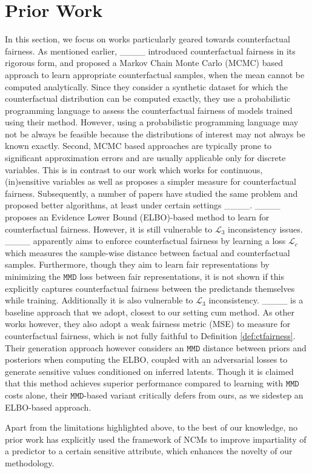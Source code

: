 \section{Prior Work}
\label{subsec:prior_work}
In this section, we focus on works particularly geared towards counterfactual fairness. As mentioned earlier, ____ introduced counterfactual fairness in its rigorous form, and proposed a Markov Chain Monte Carlo (MCMC) based approach to learn appropriate counterfactual samples, when the mean cannot be computed analytically. Since they consider a synthetic dataset for which the counterfactual distribution can be computed exactly, they use a probabilistic programming language to assess the counterfactual fairness of models trained using their method. However, using a probabilistic programming language may not be always be feasible because the distributions of interest may not always be known exactly. Second, MCMC based approaches are typically prone to significant approximation errors and are usually applicable only for discrete variables. This is in contrast to our work which works for continuous, (in)sensitive variables as well as proposes a simpler measure for counterfactual fairness. Subsequently, a number of papers have studied the same problem and proposed better algorithms, at least under certain settings ____.
____ proposes an Evidence Lower Bound (ELBO)-based method to learn for counterfactual fairness. However, it is still vulnerable to $\mathcal{L}_3$ inconsistency issues. ____ apparently aims to enforce counterfactual fairness by learning a loss $\mathcal{L}_c$ which measures the sample-wise distance between factual and counterfactual samples. Furthermore, though they aim to learn fair representations by minimizing the $\texttt{MMD}$ loss between fair representations, it is not shown if this explicitly captures counterfactual fairness between the predictands themselves while training. Additionally it is also vulnerable to $\mathcal{L}_3$ inconsistency. ____ is a baseline approach that we adopt, closest to our setting cum method. As other works however, they also adopt a weak fairness metric (MSE) to measure for counterfactual fairness, which is not fully faithful to Definition \ref{def:ctfairness}. Their generation approach however considers an $\texttt{MMD}$ distance between priors and posteriors when computing the ELBO, coupled with an adversarial losses to generate sensitive values conditioned on inferred latents. Though it is claimed that this method achieves superior performance compared to learning with $\texttt{MMD}$ costs alone, their $\texttt{MMD}$-based variant critically defers from ours, as we sidestep an ELBO-based approach. 

Apart from the limitations highlighted above, to the best of our knowledge, no prior work has explicitly used the framework of NCMs to improve impartiality of a predictor to a certain sensitive attribute, which enhances the novelty of our methodology.